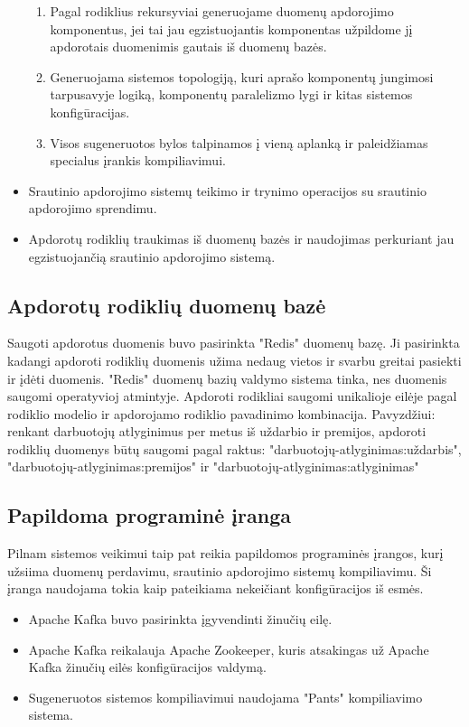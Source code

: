 \documentclass{VUMIFPSbakalaurinis}
\begin{document}
\begin{itemize}
\begin{enumerate}
        \item Pagal rodiklius rekursyviai generuojame duomenų apdorojimo komponentus, jei tai jau egzistuojantis komponentas užpildome jį apdorotais duomenimis gautais iš duomenų bazės. 
        \item Generuojama sistemos topologiją, kuri aprašo komponentų jungimosi tarpusavyje logiką, komponentų paralelizmo lygi ir kitas sistemos konfigūracijas. 
        \item Visos sugeneruotos bylos talpinamos į vieną aplanką ir paleidžiamas specialus įrankis kompiliavimui.
    \end{enumerate}
    \item Srautinio apdorojimo sistemų teikimo ir trynimo operacijos su srautinio apdorojimo sprendimu.
    \item Apdorotų rodiklių traukimas iš duomenų bazės ir naudojimas perkuriant jau egzistuojančią srautinio apdorojimo sistemą.
\end{itemize}

\subsection{Apdorotų rodiklių duomenų bazė}

Saugoti apdorotus duomenis buvo pasirinkta "Redis" duomenų bazę. Ji pasirinkta kadangi apdoroti rodiklių duomenis užima nedaug vietos ir svarbu greitai pasiekti ir įdėti duomenis. "Redis" duomenų bazių valdymo sistema tinka, nes duomenis saugomi operatyvioj atmintyje. Apdoroti rodikliai saugomi unikalioje eilėje pagal rodiklio modelio ir apdorojamo rodiklio pavadinimo kombinacija. Pavyzdžiui: renkant darbuotojų atlyginimus per metus iš uždarbio ir premijos, apdoroti rodiklių duomenys būtų saugomi pagal raktus: "darbuotojų-atlyginimas:uždarbis", "darbuotojų-atlyginimas:premijos" ir "darbuotojų-atlyginimas:atlyginimas"


\subsection{Papildoma programinė įranga}

Pilnam sistemos veikimui taip pat reikia papildomos programinės įrangos, kurį užsiima duomenų perdavimu, srautinio apdorojimo sistemų kompiliavimu. Ši įranga naudojama tokia kaip pateikiama nekeičiant konfigūracijos iš esmės.
\begin{itemize}
    \item Apache Kafka buvo pasirinkta įgyvendinti žinučių eilę.
    \item Apache Kafka reikalauja Apache Zookeeper, kuris atsakingas už Apache Kafka žinučių eilės konfigūracijos valdymą.
    \item Sugeneruotos sistemos kompiliavimui naudojama "Pants" kompiliavimo sistema.
\end{itemize}
\end{document}
